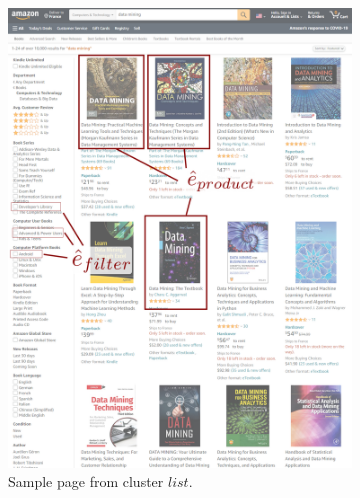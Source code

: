 \begin{figure}[ht]
  \centering
  \begin{subfigure}{.35\textwidth}
    \includegraphics[width=\linewidth]{appstract/amazon_a.png}
    \caption{Sample page from cluster $list$.}
    \label{fig:amazon_a}
  \end{subfigure}
  \hspace{.1\textwidth}
  \begin{subfigure}{.35\textwidth}

\end{subfigure}
\end{figure}
